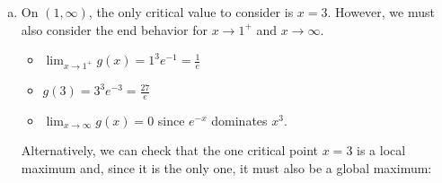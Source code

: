 \documentclass[11pt]{exam}
\begin{document}
\begin{questions}
\begin{solution}
\begin{enumerate}[(a)]
  \item On \((1,\infty)\), the only critical value to consider is
    \(x=3\). However, we must also consider the end behavior for \(x
    \to 1^+\) and \(x \to \infty\).
    \begin{itemize}
    \item \(\lim_{x \to 1^+} g(x) = 1^3 e^{-1} = \frac{1}{e}\)
    \item \(g(3) = 3^3 e^{-3} = \frac{27}{e}\)
    \item \(\lim_{x \to \infty} g(x) = 0\) since \(e^{-x}\) dominates
      \(x^3\). 
    \end{itemize}
    Alternatively, we can check that the one critical point \(x=3\) is
    a local maximum and, since it is the only one, it must also be a
    global maximum: \\



\end{enumerate}
\end{solution}
\end{questions}
\end{document}

